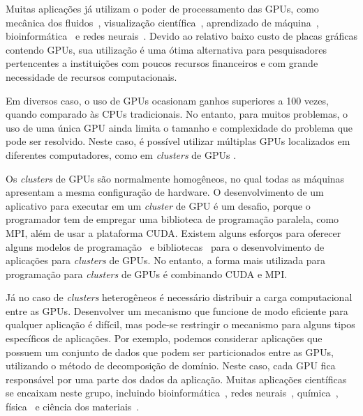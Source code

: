 Muitas aplicações já utilizam o poder de processamento das GPUs, como mecânica
dos fluidos~\cite{fluido}, visualização científica~\cite{visualizacao},
aprendizado de máquina~\cite{Aprendizado}, bioinformática~\cite{rozante} e redes
neurais~\cite{siang}. Devido ao relativo baixo custo de placas gráficas contendo
GPUs, sua utilização é uma ótima alternativa para pesquisadores pertencentes a
instituições com poucos recursos financeiros e com grande necessidade de
recursos computacionais.

Em diversos caso, o uso de GPUs ocasionam ganhos superiores a 100 vezes, quando
comparado às CPUs tradicionais\cite{Vouzis15012011}. No entanto, para muitos problemas, o uso de uma
única GPU ainda limita o tamanho e complexidade do problema que pode ser
resolvido. Neste caso, é possível utilizar múltiplas GPUs localizados em
diferentes computadores, como em \emph{clusters} de GPUs \cite{raphael,
  cluster}.

Os \emph{clusters} de GPUs são normalmente homogêneos, no qual todas as
máquinas apresentam a mesma configuração de hardware. O desenvolvimento de um
aplicativo para executar em um \emph{cluster} de GPU é um desafio, porque o
programador tem de empregar uma biblioteca de programação paralela, como MPI,
além de usar a plataforma CUDA. Existem alguns esforços para oferecer alguns
modelos de programação~\cite{appCientificas, wave} e bibliotecas~\cite{snucl,
  Flat} para o desenvolvimento de aplicações para \emph{clusters} de GPUs. No
entanto, a forma mais utilizada para programação para \emph{clusters} de GPUs
é combinando CUDA e MPI.

Já no caso de \emph{clusters} heterogêneos é necessário distribuir a carga
computacional entre as GPUs. Desenvolver um mecanismo que funcione de modo
eficiente para qualquer aplicação é difícil, mas pode-se restringir o mecanismo
para alguns tipos específicos de aplicações. Por exemplo, podemos considerar
aplicações que possuem um conjunto de dados que podem ser particionados entre as
GPUs, utilizando o método de decomposição de domínio\cite{CNM:CNM1640090307}. Neste caso, cada GPU fica
responsável por uma parte dos dados da aplicação. Muitas aplicações científicas
se encaixam neste grupo, incluindo bioinformática~\cite{rozante}, redes
neurais~\cite{siang}, química~\cite{anastas2000green}, física~\cite{delpech2009reactor} e ciência dos materiais~\cite{da2007desenvolvimento}. 

